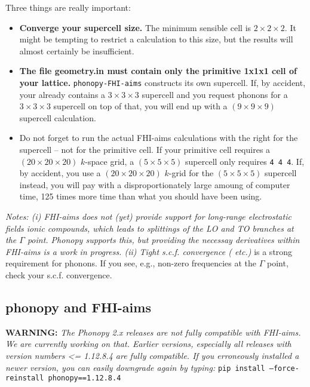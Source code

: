 Three things are really important:
\begin{itemize}
\item {\bf Converge your supercell size.} The minimum sensible cell
  is $2\times 2\times 2$. It might be tempting to restrict a
  calculation to this size, but the results will almost certainly be
  insufficient. 
\item {\bf The file geometry.in must contain only the primitive 1x1x1
  cell of your lattice.} \texttt{phonopy-FHI-aims} constructs its own  
  supercell. If, by accident, your  already
  contains a $3\times3\times3$ supercell and you request phonons for a
  $3\times3\times3$ supercell on top of that, you will end up with a 
  $(9\times 9\times 9)$ supercell calculation. 
\item Do not forget to run the actual FHI-aims calculations with the
  right  for the supercell -- not for the primitive
  cell. If your primitive cell requires a $(20\times 20\times 20)$
  $k$-space grid, a $(5\times 5\times 5)$ supercell only requires
   \texttt{4 4 4}. If, by accident, you use a
  $(20\times 20\times 20)$ $k$-grid for the $(5\times 5\times 5)$
  supercell instead, you will pay with a disproportionately large
  amoung of computer time, 125 times more time than what you should have
  been using. 
\end{itemize}

\emph{Notes: (i)
  FHI-aims does not (yet) provide support for long-range electrostatic
  fields ionic compounds, which leads to splittings of the LO and TO
  branches at the $\Gamma$ point. Phonopy supports this, but providing
  the necessay derivatives within FHI-aims is a work in progress. (ii)
  Tight s.c.f. convergence ( etc.)} is a
  strong requirement for phonons. If you see, e.g., non-zero
  frequencies at the $\Gamma$ point, check your s.c.f. convergence.


\subsection*{phonopy and FHI-aims}
\textbf{WARNING:} \textit{The Phonopy 2.x releases are not fully compatible with FHI-aims. 
We are currently working on that. Earlier versions, especially all releases with version numbers <= 1.12.8.4 
are fully compatible. If you erroneously installed a newer version, you can easily downgrade
again by typing:} \texttt{pip install --force-reinstall phonopy==1.12.8.4}


